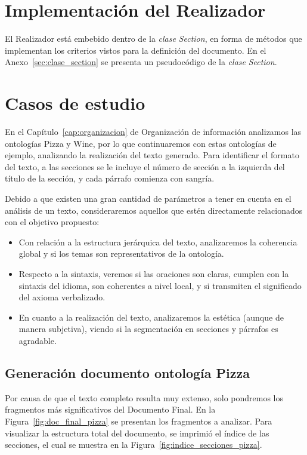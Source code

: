 \section{Implementación del Realizador}
\label{sec:realizacion}
El Realizador está embebido dentro de la \textit{clase }\textit{Section}, en forma de métodos que implementan los criterios vistos para la definición del documento. En el Anexo~\ref{sec:clase_section} se presenta un pseudocódigo de la\textit{ clase }\textit{Section}.

\section{Casos de estudio}
En el Capítulo~\ref{cap:organizacion} de Organización de información analizamos las ontologías Pizza y Wine, por lo que continuaremos con estas ontologías de ejemplo, analizando la realización del texto generado. Para identificar el formato del texto, a las secciones se le incluye el número de sección a la izquierda del título de la sección, y cada párrafo comienza con sangría.

Debido a que existen una gran cantidad de  parámetros a tener en cuenta en el análisis de un texto, consideraremos aquellos que estén directamente relacionados con el objetivo propuesto: 

\begin{itemize}
    \item Con relación a la estructura jerárquica del texto, analizaremos la coherencia global y si los temas son representativos de la ontología.
    \item Respecto a la sintaxis, veremos si las oraciones son claras, cumplen con la sintaxis del idioma, son coherentes a nivel local, y si transmiten el significado del axioma verbalizado. 
    \item En cuanto a la realización del texto, analizaremos la estética (aunque de manera subjetiva), viendo si la segmentación en secciones y párrafos es agradable.
\end{itemize}


\subsection{Generación documento ontología Pizza}
Por causa de que el texto completo resulta muy extenso, solo pondremos los fragmentos más significativos del Documento Final. En la Figura~\ref{fig:doc_final_pizza} se presentan los fragmentos a analizar. Para visualizar la estructura total del documento, se imprimió el índice de las secciones, el cual se muestra en la Figura~\ref{fig:indice_secciones_pizza}. 

